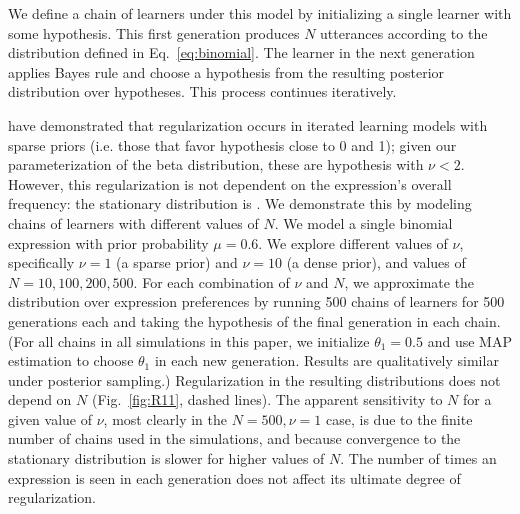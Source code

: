 \documentclass{evolang11}
\begin{document}

We define a chain of learners under this model by initializing a single learner with some hypothesis. This first generation produces $N$ utterances according to the distribution defined in Eq.\ \ref{eq:binomial}. The learner in the next generation applies Bayes rule and choose a hypothesis from the resulting posterior distribution over hypotheses. This process continues iteratively.

 have demonstrated that regularization occurs in iterated learning models with sparse priors (i.e. those that favor hypothesis close to 0 and 1); given our parameterization of the beta distribution, these are hypothesis with $\nu<2$. However, this regularization is not dependent on the expression's overall frequency: the stationary distribution is . We demonstrate this by modeling chains of learners with different values of $N$. We model a single binomial expression with prior probability $\mu=0.6$. We explore different values of $\nu$, specifically $\nu=1$ (a sparse prior) and $\nu=10$ (a dense prior), and values of $N=10,100,200,500$. For each combination of $\nu$ and $N$, we approximate the distribution over expression preferences by running 500 chains of learners for 500 generations each and taking the hypothesis of the final generation in each chain. (For all chains in all simulations in this paper, we initialize $\theta_1=0.5$ and use MAP estimation to choose $\theta_1$ in each new generation. Results are qualitatively similar under posterior sampling.)  Regularization in the resulting distributions does not depend on $N$ (Fig.\ \ref{fig:R11}, dashed lines). The apparent sensitivity to $N$ for a given value of $\nu$, most clearly in the $N=500, \nu=1$ case, is due to the finite number of chains used in the simulations, and because convergence to the stationary distribution is slower for higher values of $N$. The number of times an expression is seen in each generation does not affect its ultimate degree of regularization.
\end{document}
